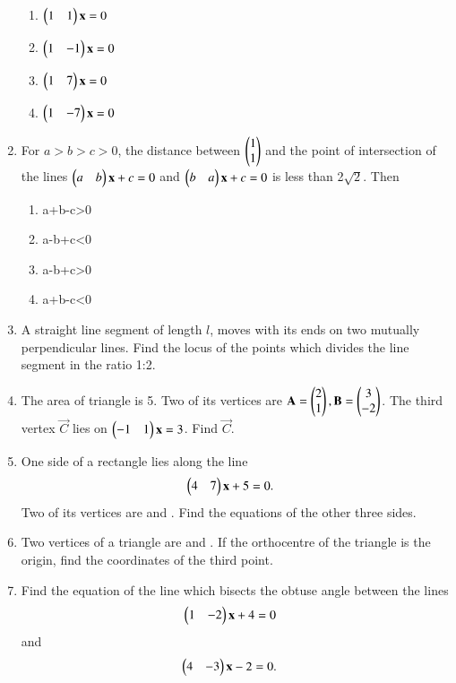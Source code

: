 \begin{enumerate}[label=\arabic*.,ref=\thesubsection.\theenumi]
    \begin{enumerate}
     \item  $\begin{pmatrix}1 & 1\end{pmatrix} \mathbf {x} = 0$
     \item  $\begin{pmatrix}1 & -1\end{pmatrix} \mathbf {x} = 0$
     \item  $\begin{pmatrix}1 & 7\end{pmatrix} \mathbf {x} = 0$
     \item  $\begin{pmatrix}1 & -7\end{pmatrix} \mathbf {x} = 0$
     \end{enumerate}
    \item For $a > b > c > 0$, the distance between $\begin{pmatrix}1\\1\end{pmatrix}$ and the point of intersection of the lines $\begin{pmatrix}a & b\end{pmatrix}\mathbf {x}+c=0$ and $\begin{pmatrix}b & a\end{pmatrix} \mathbf {x}+c=0$ is less than 2$\sqrt2$. Then 
    \begin{enumerate}
     \item  a+b-c\textgreater 0
     \item  a-b+c\textless 0
     \item  a-b+c\textgreater 0
     \item  a+b-c\textless 0
    \end{enumerate}
    \item  A straight line segment of length $l$, moves with its ends on two mutually perpendicular lines. Find the locus of the points which divides the line segment in the ratio 1:2.
    \item The area of triangle is 5. Two of its vertices are $\mathbf{A} = \begin{pmatrix}2\\1\end{pmatrix}, \mathbf{B} = \begin{pmatrix}3\\-2\end{pmatrix}$. The third vertex $\vec{C}$ lies on $\begin{pmatrix}-1 & 1\end{pmatrix}\mathbf {x} = 3$. Find $\vec{C}$.
    \item One side of a rectangle lies along the line \begin{align}\begin{pmatrix}4 & 7\end{pmatrix} \mathbf {x} + 5 &= 0.\end{align} Two of its vertices are  and . Find the equations of the other three sides.
    \item  Two vertices of a triangle are  and . If  the orthocentre of the triangle is the origin, find the coordinates of the third point.
     \item  Find the equation of the line which bisects the obtuse angle between the lines \begin{align}\begin{pmatrix}1 & -2\end{pmatrix} \mathbf {x} + 4 &= 0\end{align} and \begin{align}\begin{pmatrix}4 & -3\end{pmatrix} \mathbf {x} -2 &= 0.\end{align}

\end{enumerate}
